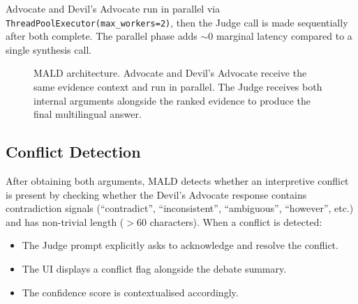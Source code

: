 \documentclass[12pt,a4paper]{article}
\begin{document}
Advocate and Devil's Advocate run in parallel via \texttt{ThreadPoolExecutor(max\_workers=2)},
then the Judge call is made sequentially after both complete. The parallel phase
adds $\sim$0 marginal latency compared to a single synthesis call.

\begin{figure}[H]
\centering
{}
\caption{MALD architecture. Advocate and Devil's Advocate receive the same evidence
context and run in parallel. The Judge receives both internal arguments alongside
the ranked evidence to produce the final multilingual answer.}
\label{fig:mald}
\end{figure}

\subsection{Conflict Detection}

After obtaining both arguments, MALD detects whether an interpretive conflict is
present by checking whether the Devil's Advocate response contains contradiction
signals (``contradict'', ``inconsistent'', ``ambiguous'', ``however'', etc.) and
has non-trivial length ($>60$ characters). When a conflict is detected:
\begin{itemize}[leftmargin=*,nosep]
\item The Judge prompt explicitly asks to acknowledge and resolve the conflict.
\item The UI displays a conflict flag alongside the debate summary.
\item The confidence score is contextualised accordingly.
\end{itemize}
\end{document}
